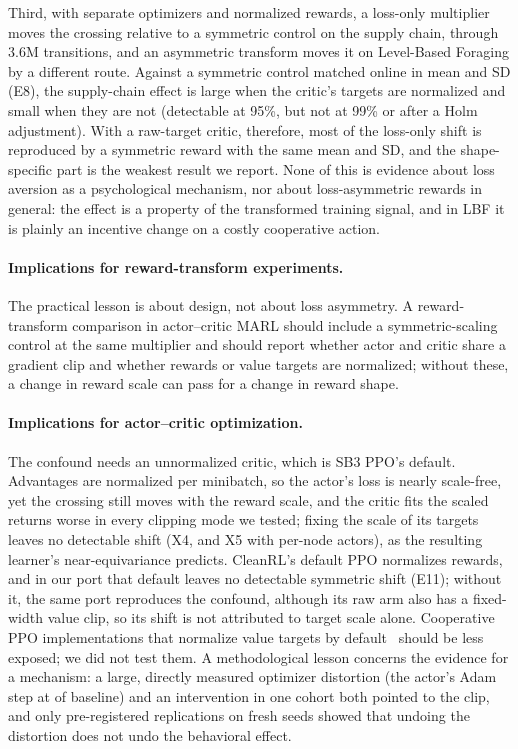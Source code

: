 Third, with separate optimizers and
normalized rewards, a loss-only multiplier moves the crossing relative to a symmetric control on the
supply chain, through 3.6M transitions, and an asymmetric transform moves it on Level-Based Foraging by a
different route. Against a symmetric control matched online in mean and SD (E8), the supply-chain effect is
large when the critic's targets are normalized and small when they are not (detectable at 95\%, but not at 99\% or after a
Holm adjustment). With a raw-target critic, therefore, most of the loss-only shift is reproduced by a symmetric
reward with the same mean and SD, and the shape-specific part is the weakest result we report. None of this is evidence
about loss aversion as a psychological mechanism, nor about loss-asymmetric rewards in general: the effect is
a property of the transformed training signal, and in LBF it is plainly an incentive change on a costly
cooperative action.

\paragraph{Implications for reward-transform experiments.}
The practical lesson is about design, not about loss asymmetry. A reward-transform comparison in
actor--critic MARL should include a symmetric-scaling control at the same multiplier and should report
whether actor and critic share a gradient clip and whether rewards or value targets are normalized; without
these, a change in reward scale can pass for a change in reward shape.

\paragraph{Implications for actor--critic optimization.}
The confound needs an unnormalized critic, which is SB3 PPO's default. Advantages are normalized per minibatch,
so the actor's loss is nearly scale-free, yet the crossing still moves with the reward scale, and the critic fits
the scaled returns worse in every clipping mode we tested; fixing the scale of its targets leaves no detectable shift (X4, and X5 with per-node actors), as the resulting learner's near-equivariance predicts. CleanRL's default PPO normalizes rewards, and in our
port that default leaves no detectable symmetric shift (E11); without it, the same port reproduces the confound, although its raw arm also has a fixed-width value clip, so its shift
is not attributed to target scale alone.
Cooperative PPO implementations that normalize value targets by default~\citep{yu2022surprising} should be less
exposed; we did not test them. A methodological lesson concerns the evidence for a mechanism: a large, directly
measured optimizer distortion (the actor's Adam step at \VxoGlobStep{} of baseline) and an intervention in one
cohort both pointed to the clip, and only pre-registered replications on fresh seeds showed that undoing the distortion
does not undo the behavioral effect.

